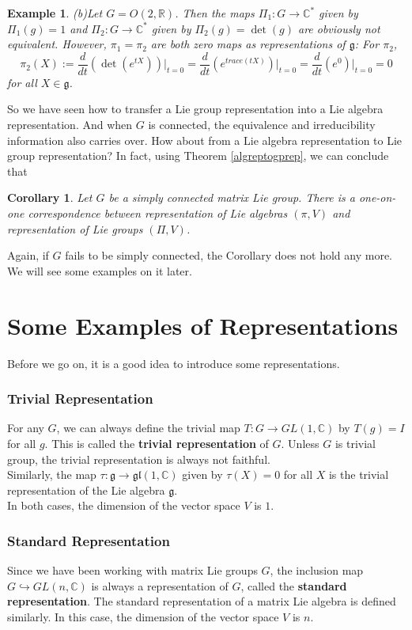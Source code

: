 \documentclass[11pt]{book}
\newtheorem{corollary}[theorem]{Corollary}
\newtheorem{example}[theorem]{Example}
\newcommand{\bb}[1]{\mathbb{#1}}
\newcommand{\mf}[1]{\mathfrak{#1}}
\begin{document}
\begin{example}
\noindent (b)Let $G = O(2,\bb{R})$. Then the maps $\Pi_1: G \to \bb{C}^*$ given by $\Pi_1(g) = 1$ and $\Pi_2: G \to \bb{C}^*$ given by $\Pi_2(g) = \det(g)$ are obviously not equivalent. However, $\pi_1 = \pi_2$ are both zero maps as representations of $\mf{g}$: For $\pi_2$,
$$\pi_2(X) := \frac{d}{dt}(\det(e^{tX}))  \Big|_{t=0} = \frac{d}{dt}(e^{trace(tX)})  \Big|_{t=0} = \frac{d}{dt}(e^0)  \Big|_{t=0} = 0$$
for all $X \in \mf{g}$.


\end{example}


So we have seen how to transfer a Lie group representation into a Lie algebra representation. And when $G$ is connected, the equivalence and irreducibility information also carries over. How about from a Lie algebra representation to Lie group representation? In fact, using Theorem \ref{algreptogprep}, we can conclude that
\begin{corollary}
Let $G$ be a simply connected matrix Lie group. There is a one-on-one correspondence between representation of Lie algebras $(\pi,V)$ and representation of Lie groups $(\Pi,V)$.
\end{corollary}
Again, if $G$ fails to be simply connected, the Corollary does not hold any more. We will see some examples on it later.

\section{Some Examples of Representations}
Before we go on, it is a good idea to introduce some representations.
\subsubsection{Trivial Representation}
For any $G$, we can always define the trivial map $T: G \to GL(1,\bb{C})$ by $T(g) = I$ for all $g$. This is called the \textbf{trivial representation} of $G$. Unless $G$ is trivial group, the trivial representation is always not faithful.\\
Similarly, the map $\tau: \mf{g} \to \mf{gl}(1,\bb{C})$ given by $\tau(X) = 0$ for all $X$ is the trivial representation of the Lie algebra $\mf{g}$.\\
In both cases, the dimension of the vector space $V$ is $1$.
\subsubsection{Standard Representation}
Since we have been working with matrix Lie groups $G$, the inclusion map $G \hookrightarrow GL(n,\bb{C})$ is always a representation of $G$, called the \textbf{standard representation}. The standard representation of a matrix Lie algebra is defined similarly.
In this case, the dimension of the vector space $V$ is $n$.
\end{document}
